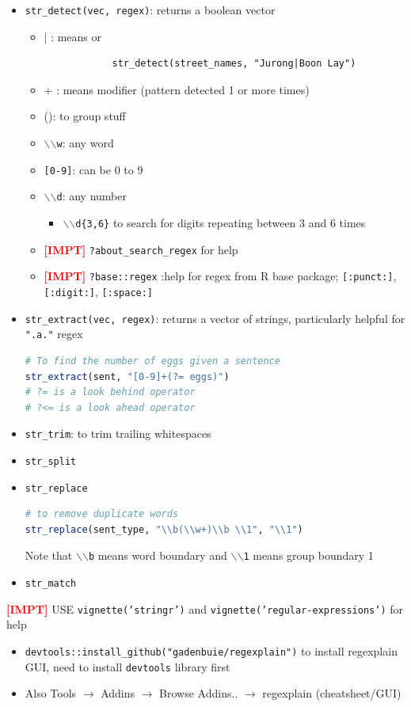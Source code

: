 \documentclass{article}
\newcommand{\impt}[0]{\textcolor{red}{\textbf{[IMPT] }}}
\begin{document}
\begin{multicols}{2}
\begin{itemize}
\begin{itemize}
	\end{itemize}
	\item \texttt{str\_detect(vec, regex)}: returns a boolean vector
	\begin{itemize}
		\item | : means or
		\begin{verbatim}
			str_detect(street_names, "Jurong|Boon Lay")
		\end{verbatim}
		\item + : means modifier (pattern detected 1 or more times)
		\item (): to group stuff
		\item \texttt{$\backslash$$\backslash$w}: any word
		\item \texttt{[0-9]}: can be 0 to 9
		\item \texttt{$\backslash$$\backslash$d}: any number
		\begin{itemize}
			\item \texttt{$\backslash$$\backslash$d\{3,6\}} to search for digits repeating between 3 and 6 times
		\end{itemize}
		\item \impt \texttt{?about\_search\_regex} for help
		\item \impt \texttt{?base::regex} :help for regex from R base package; \texttt{[:punct:]}, \texttt{[:digit:]}, \texttt{[:space:]}
	\end{itemize}
	\item \texttt{str\_extract(vec, regex)}: returns a vector of strings, particularly helpful for \texttt{".a."} regex
	\begin{lstlisting}[language=R]
# To find the number of eggs given a sentence
str_extract(sent, "[0-9]+(?= eggs)")
# ?= is a look behind operator
# ?<= is a look ahead operator
	\end{lstlisting}
	\item \texttt{str\_trim}: to trim trailing whitespaces
	\item \texttt{str\_split}
	\item \texttt{str\_replace}
	\begin{lstlisting}[language=R]
# to remove duplicate words
str_replace(sent_type, "\\b(\\w+)\\b \\1", "\\1")\end{lstlisting}
Note that \texttt{$\backslash$$\backslash$b} means word boundary and \texttt{$\backslash$$\backslash$1} means group boundary 1
\item \texttt{str\_match}
\end{itemize}
\impt USE \texttt{vignette('stringr')} and \texttt{vignette('regular-expressions')} for help
\begin{itemize}
	\item \texttt{devtools::install\_github("gadenbuie/regexplain")} to install regexplain GUI, need to install \texttt{devtools} library first
	\item Also Tools $\rightarrow$ Addins $\rightarrow$ Browse Addins.. $\rightarrow$ regexplain (cheatsheet/GUI)
\end{itemize}

\end{multicols}
\end{document}
